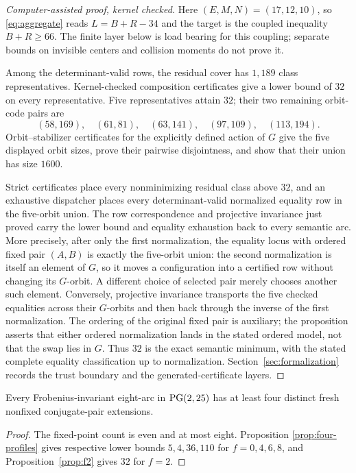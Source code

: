 \begin{proof}[Computer-assisted proof, kernel checked]
Here $(E,M,N)=(17,12,10)$, so \eqref{eq:aggregate} reads
$L=B+R-34$ and the target is the coupled inequality $B+R\ge66$.
The finite layer below is load bearing for this coupling; separate bounds
on invisible centers and collision moments do not prove it.

Among the determinant-valid rows, the residual cover has $1{,}189$
class representatives.  Kernel-checked composition certificates
give a lower bound of $32$ on every representative.  Five representatives
attain $32$; their two remaining orbit-code pairs are
\[
 (58,169),\quad(61,81),\quad(63,141),\quad(97,109),\quad(113,194).
\]
Orbit--stabilizer certificates for the explicitly defined action of $G$ give
the five displayed orbit sizes, prove their pairwise disjointness, and show
that their union has size $1600$.

Strict certificates place every nonminimizing residual class above $32$,
and an exhaustive dispatcher places every determinant-valid normalized
equality row in the five-orbit union.  The row correspondence and
projective invariance just proved carry the lower bound and equality
exhaustion back to every semantic arc.  More precisely, after only the first
normalization, the equality locus with ordered fixed pair $(A,B)$ is exactly
the five-orbit union: the second normalization is itself an element of $G$,
so it moves a configuration into a certified row without changing its
$G$-orbit.  A different choice of selected pair merely chooses another such
element.  Conversely, projective invariance transports the five checked
equalities across their $G$-orbits and then back through the inverse of the
first normalization.  The ordering of the original fixed pair is auxiliary;
the proposition asserts that either ordered normalization lands in the stated
ordered model, not that the swap lies in $G$.
Thus $32$ is the exact semantic minimum, with the stated complete equality
classification up to normalization.  Section~\ref{sec:formalization}
records the trust boundary and the generated-certificate layers.
\end{proof}

\begin{theorem}\label{thm:q25}
Every Frobenius-invariant eight-arc in $\operatorname{PG}(2,25)$ has at least four distinct
fresh nonfixed conjugate-pair extensions.
\end{theorem}

\begin{proof}
The fixed-point count is even and at most eight.  Proposition
\ref{prop:four-profiles} gives respective lower bounds $5,4,36,110$ for
$f=0,4,6,8$, and Proposition~\ref{prop:f2} gives $32$ for $f=2$.
\end{proof}


